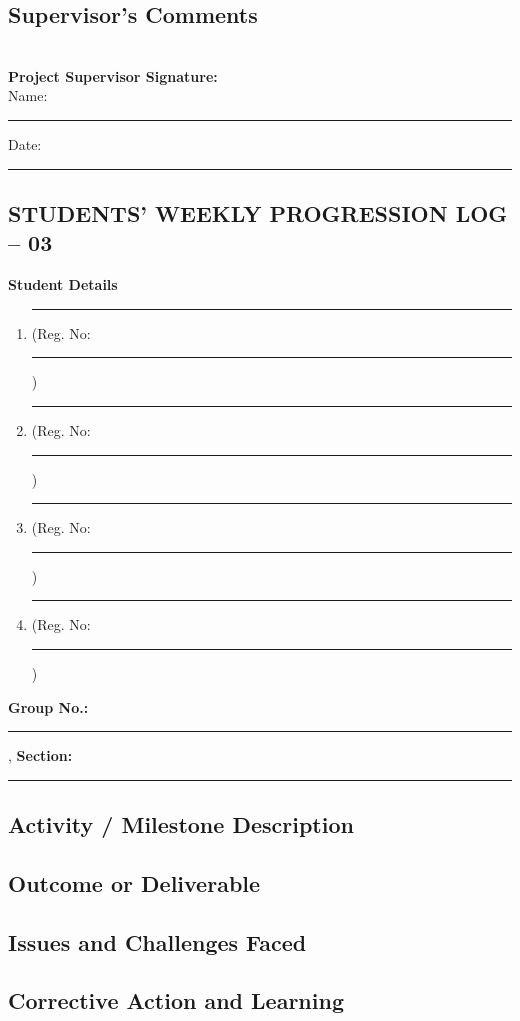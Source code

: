 \documentclass[a4paper]{article}
\begin{document}
\subsection*{Supervisor's Comments}
\framebox[\textwidth][c]{\rule{0pt}{4cm}}\\[2em]

\vfill
\textbf{Project Supervisor Signature:}\\[1em]
Name: \rule{6cm}{0.4pt} \hfill Date: \rule{4cm}{0.4pt}


\newpage
\begin{center}
\section*{STUDENTS' WEEKLY PROGRESSION LOG -- 03}
\end{center}
{\Large\textbf{Student Details}}\\[0.1em]
\begin{enumerate}[itemsep=0em]
\item \rule{8cm}{0.4pt} (Reg. No:\rule{2cm}{0.4pt})
\item \rule{8cm}{0.4pt} (Reg. No:\rule{2cm}{0.4pt})
\item \rule{8cm}{0.4pt} (Reg. No:\rule{2cm}{0.4pt})
\item \rule{8cm}{0.4pt} (Reg. No:\rule{2cm}{0.4pt})
\end{enumerate}
\textbf{Group No.:} \rule{4cm}{0.4pt}, \textbf{Section:} \rule{3.5cm}{0.4pt}

				 
\subsection*{Activity / Milestone Description}
\framebox[\textwidth][c]{\rule{0pt}{4cm}}

\subsection*{Outcome or Deliverable}
\framebox[\textwidth][c]{\rule{0pt}{4cm}}


\subsection*{Issues and Challenges Faced}
\framebox[\textwidth][c]{\rule{0pt}{4cm}}


\subsection*{Corrective Action and Learning}
\framebox[\textwidth][c]{\rule{0pt}{4cm}}
\end{document}
